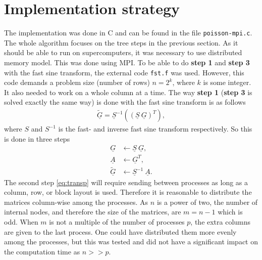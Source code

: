 \section{Implementation strategy}
%
The implementation was done in C and can be found in the file \verb+poisson-mpi.c+. The whole algorithm focuses on the tree steps in the previous section. As it should be able to run on supercomputers, it was necessary to use distributed memory model. This was done using MPI. To be able to do \textbf{step 1} and \textbf{step 3} with the fast sine transform, the external code \verb+fst.f+ was used. However, this code demands a problem size (number of rows) $n = 2^k$, where $k$ is some integer. It also needed to work on a whole column at a time. The way \textbf{step 1} (\textbf{step 3} is solved exactly the same way) is done with the fast sine transform is as follows
%
\begin{align}
\underline{\tilde{G}} = \underline{S}^{-1} \left( (\underline{S} \: \underline{G})^T   \right),
\end{align}
%
where $S$ and $S^{-1}$ is the fast- and inverse fast sine transform respectively. So this is done in three steps
%
\begin{align}
   \underline{G} &\leftarrow \underline{S} \: \underline{G},\\ 
  \label{eq:transp} 
  \underline{A} &\leftarrow \underline{G}^T,\\ 
  \underline{\tilde G} &\leftarrow \underline{S}^{-1} \: \underline{A}.
\end{align}
%
The second step \eqref{eq:transp} will require sending between processes as long as a column, row, or block layout is used. Therefore it is reasonable to distribute the matrices column-wise among the processes. As $n$ is a power of two, the number of internal nodes, and therefore the size of the matrices, are $m = n-1$ which is odd. When $m$ is not a multiple of the number of processes $p$, the extra columns are given to the last process. One could have distributed them more evenly among the processes, but this was tested and did not have a significant impact on the computation time as $n >> p$.

